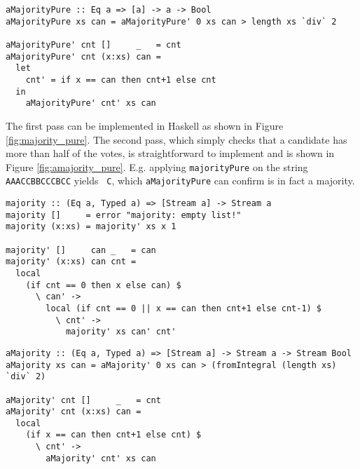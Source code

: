 \begin{figure*}[!htb]
\begin{lstlisting}[language = Copilot, frame = none]
aMajorityPure :: Eq a => [a] -> a -> Bool
aMajorityPure xs can = aMajorityPure' 0 xs can > length xs `div` 2

aMajorityPure' cnt []     _   = cnt
aMajorityPure' cnt (x:xs) can =
  let
    cnt' = if x == can then cnt+1 else cnt
  in
    aMajorityPure' cnt' xs can
\end{lstlisting}
\caption{The second pass of the majority vote algorithm in Haskell.}
\label{fig:amajority_pure}
\end{figure*}

The first pass can be implemented
in Haskell as shown in Figure \ref{fig:majority_pure}. The second pass, which
simply checks that a candidate has more than half of the votes, is
straightforward to implement and is shown in Figure \ref{fig:amajority_pure}.
E.g. applying {\tt majorityPure} on the string {\tt AAACCBBCCCBCC} yields {\tt
  C}, which {\tt aMajorityPure} can confirm is in fact a majority.

\begin{figure*}[!htb]
\begin{lstlisting}[language = Copilot, frame = none]
majority :: (Eq a, Typed a) => [Stream a] -> Stream a
majority []     = error "majority: empty list!"
majority (x:xs) = majority' xs x 1

majority' []     can _   = can
majority' (x:xs) can cnt =
  local
    (if cnt == 0 then x else can) $
      \ can' ->
        local (if cnt == 0 || x == can then cnt+1 else cnt-1) $
          \ cnt' ->
            majority' xs can' cnt'
\end{lstlisting}
\caption{The first pass of the majority vote algorithm in Copilot.}
\label{fig:majority}
\end{figure*}

\begin{figure*}[!htb]
\begin{lstlisting}[language = Copilot, frame = none]
aMajority :: (Eq a, Typed a) => [Stream a] -> Stream a -> Stream Bool
aMajority xs can = aMajority' 0 xs can > (fromIntegral (length xs) `div` 2)

aMajority' cnt []     _   = cnt
aMajority' cnt (x:xs) can =
  local
    (if x == can then cnt+1 else cnt) $
      \ cnt' ->
        aMajority' cnt' xs can
\end{lstlisting}
\caption{The second pass of the majority vote algorithm in Copilot.}
\label{fig:amajority}
\end{figure*}

